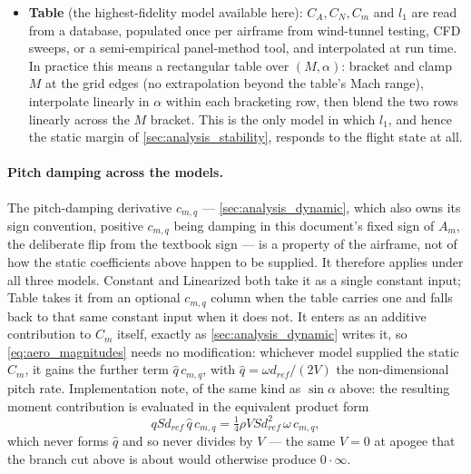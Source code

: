 \begin{itemize}
    every evaluation. $\sin\alpha$ removes the discontinuity (and, at large $\alpha$, is arguably
    more correct besides: it is exactly zero at $\alpha=\pi$, matching the zero net side force a
    body of revolution has flying exactly tail-first by symmetry).
    \item \textbf{Table} (the highest-fidelity model available here): $C_A,C_N,C_m$ and $l_1$ are
    read from a database, populated once per airframe from wind-tunnel testing, CFD sweeps, or a
    semi-empirical panel-method tool, and interpolated at run time. In practice this means a
    rectangular table over $(M,\alpha)$: bracket and clamp $M$ at the grid edges (no extrapolation
    beyond the table's Mach range), interpolate linearly in $\alpha$ within each bracketing row,
    then blend the two rows linearly across the $M$ bracket. This is the only model in which $l_1$,
    and hence the static margin of \autoref{sec:analysis_stability}, responds to the flight state
    at all.
\end{itemize}

\paragraph{Pitch damping across the models.} The pitch-damping derivative $c_{m,q}$ ---
\autoref{sec:analysis_dynamic}, which also owns its sign convention, positive $c_{m,q}$ being
damping in this document's fixed sign of $A_m$, the deliberate flip from the textbook sign --- is a
property of the airframe, not of how the static coefficients above happen to be supplied. It
therefore applies under all three models. Constant and Linearized both take it as a single constant
input; Table takes it from an optional $c_{m,q}$ column when the table carries one and falls back
to that same constant input when it does not. It enters as an additive contribution to $C_m$
itself, exactly as \autoref{sec:analysis_dynamic} writes it, so \autoref{eq:aero_magnitudes} needs
no modification: whichever model supplied the static $C_m$, it gains the further term
$\hat{q}\,c_{m,q}$, with $\hat{q}=\omega d_{ref}/(2V)$ the non-dimensional pitch rate.
Implementation note, of the same kind as $\sin\alpha$ above: the resulting moment contribution is
evaluated in the equivalent product form
\begin{equation} \label{eq:pitch_damping_moment}
    qSd_{ref}\,\hat{q}\,c_{m,q} = \tfrac14\rho VSd_{ref}^2\,\omega\,c_{m,q},
\end{equation}
which never forms $\hat{q}$ and so never divides by $V$ --- the same $V=0$ at apogee that the
branch cut above is about would otherwise produce $0\cdot\infty$.

